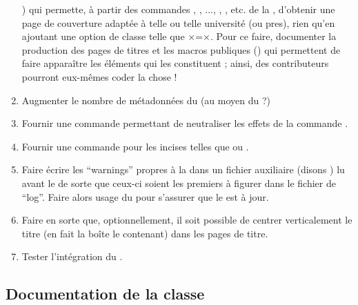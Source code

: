 \begin{enumerate}
  ) qui permette, à partir des commandes
  , , ...,
  , , etc. de la \yatcl{},
  d'obtenir une page de couverture adaptée à telle ou telle université (ou
  \gls{pres}), rien qu'en ajoutant une option de classe telle que
  ×=×. Pour ce faire, documenter la
  production des pages de titres et les macros publiques
  () qui permettent de faire apparaître les éléments
  qui les constituent ; ainsi, des contributeurs pourront eux-mêmes coder la
  chose !
\item Augmenter le nombre de métadonnées du  (au moyen du
   ?)
\item Fournir une commande  permettant de
  neutraliser les effets de la commande .
\item Fournir une commande  pour les incises telles que
   ou .
\item Faire écrire les \foreignquote{english}{warnings} propres à la \yatcl{}
  dans un fichier auxiliaire (disons ) lu avant le  de sorte que ceux-ci
  soient les premiers à figurer dans le fichier de
  \foreignquote{english}{log}. Faire alors usage du 
  pour s'assurer que le  est à jour.
\item Faire en sorte que, optionnellement, il soit possible de centrer
  verticalement le titre (en fait la boîte le contenant) dans les pages de
  titre.
\item Tester l'intégration du .
\end{enumerate}

\subsection{Documentation de la classe}
\label{sec:documentation-de-la-ult}

